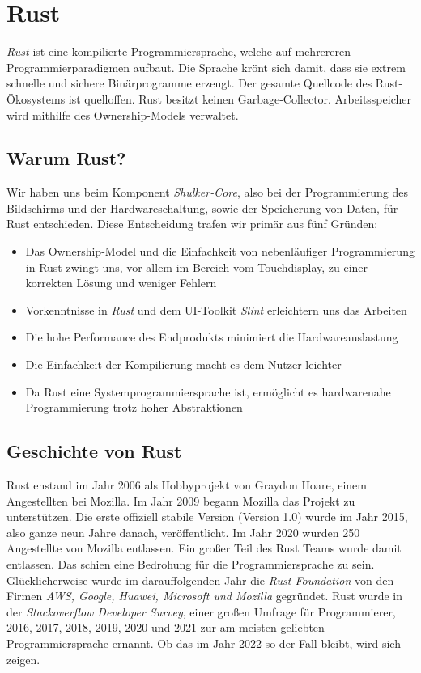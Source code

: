 \section{Rust}
\label{Rust}
\lstset{language=rust}

\textit{Rust} ist eine kompilierte Programmiersprache, welche auf mehrereren
Programmierparadigmen aufbaut. Die Sprache krönt sich damit, dass
sie extrem schnelle und sichere Binärprogramme erzeugt. \cite{rustlangbook1}
Der gesamte Quellcode des Rust-Ökosystems ist quelloffen. Rust besitzt keinen Garbage-Collector.
Arbeitsspeicher wird mithilfe des Ownership-Models verwaltet.

\subsection{Warum Rust?}
Wir haben uns beim Komponent \textit{Shulker-Core}, also bei der Programmierung
des Bildschirms und der Hardwareschaltung, sowie der Speicherung
von Daten, für Rust entschieden. Diese Entscheidung trafen wir primär
aus fünf Gründen:

\begin{itemize}
    \item Das Ownership-Model und die Einfachkeit von nebenläufiger Programmierung in Rust zwingt uns, vor allem im Bereich vom Touchdisplay, zu einer korrekten Lösung und weniger Fehlern
    \item Vorkenntnisse in \textit{Rust} und dem UI-Toolkit \textit{Slint} erleichtern uns das Arbeiten
    \item Die hohe Performance des Endprodukts minimiert die Hardwareauslastung
    \item Die Einfachkeit der Kompilierung macht es dem Nutzer leichter
    \item Da Rust eine Systemprogrammiersprache ist, ermöglicht es hardwarenahe Programmierung trotz hoher Abstraktionen
\end{itemize}

\subsection{Geschichte von Rust}
Rust enstand im Jahr 2006 als Hobbyprojekt von Graydon Hoare, einem Angestellten
bei Mozilla. \cite{rustwiki} Im Jahr 2009 begann Mozilla das Projekt zu unterstützen. Die erste
offiziell stabile Version (Version 1.0) wurde im Jahr 2015, also ganze neun Jahre danach, veröffentlicht.
Im Jahr 2020 wurden 250 Angestellte von Mozilla entlassen.  Ein großer
Teil des Rust Teams wurde damit entlassen. Das schien eine Bedrohung für
die Programmiersprache zu sein. Glücklicherweise wurde im darauffolgenden Jahr die
\textit{Rust Foundation} von den Firmen \textit{AWS, Google, Huawei, Microsoft und Mozilla} gegründet.
Rust wurde in der \textit{Stackoverflow Developer Survey}, einer großen Umfrage
für Programmierer, 2016, 2017, 2018, 2019, 2020 und 2021 zur am meisten geliebten Programmiersprache
ernannt. Ob das im Jahr 2022 so der Fall bleibt, wird sich zeigen.


